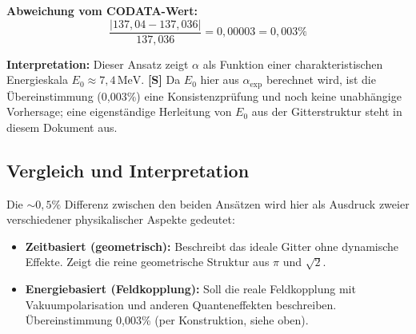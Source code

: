 	\textbf{Abweichung vom CODATA-Wert:}
	\begin{equation}
		\frac{|137{,}04 - 137{,}036|}{137{,}036} = 0{,}00003 = 0{,}003\%
	\end{equation}
	
	\textbf{Interpretation:} Dieser Ansatz zeigt \(\alpha\) als Funktion einer charakteristischen Energieskala \(E_0 \approx 7{,}4\,\text{MeV}\). \textbf{[S]} Da \(E_0\) hier aus \(\alpha_{\exp}\) berechnet wird, ist die Übereinstimmung (0{,}003\%) eine Konsistenzprüfung und noch keine unabhängige Vorhersage; eine eigenständige Herleitung von \(E_0\) aus der Gitterstruktur steht in diesem Dokument aus.
	
	\subsection{Vergleich und Interpretation}
	
	\begin{table}[h!]
		\centering
		\caption{Vergleich der beiden theoretischen T0-Ansätze mit dem experimentellen Wert.}
	\end{table}
	
	Die \(\sim0{,}5\%\) Differenz zwischen den beiden Ansätzen wird hier als Ausdruck zweier verschiedener physikalischer Aspekte gedeutet:
	
	\begin{itemize}
		\item \textbf{Zeitbasiert (geometrisch):} Beschreibt das ideale Gitter ohne dynamische Effekte. Zeigt die reine geometrische Struktur aus \(\pi\) und \(\sqrt{2}\).
		
		\item \textbf{Energiebasiert (Feldkopplung):} Soll die reale Feldkopplung mit Vakuumpolarisation und anderen Quanteneffekten beschreiben. Übereinstimmung 0{,}003\% (per Konstruktion, siehe oben).
	\end{itemize}
	
